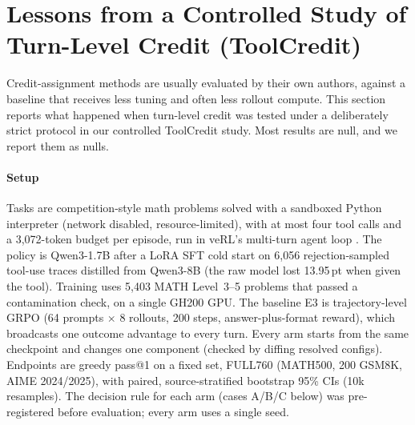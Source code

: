 \section{Lessons from a Controlled Study of Turn-Level Credit (ToolCredit)}\label{sec:toolcredit}

Credit-assignment methods are usually evaluated by their own authors, against a baseline that receives less tuning and often less rollout compute. This section reports what happened when turn-level credit was tested under a deliberately strict protocol in our controlled ToolCredit study. Most results are null, and we report them as nulls.

\paragraph{Setup}
Tasks are competition-style math problems solved with a sandboxed Python interpreter (network disabled, resource-limited), with at most four tool calls and a 3{,}072-token budget per episode, run in veRL's multi-turn agent loop \citep{sheng2025hybridflow}. The policy is Qwen3-1.7B \citep{yang2025qwen3} after a LoRA \citep{hu2022lora} SFT cold start on 6{,}056 rejection-sampled tool-use traces distilled from Qwen3-8B (the raw model lost 13.95\,pt when given the tool). Training uses 5{,}403 MATH Level~3--5 problems that passed a contamination check, on a single GH200 GPU. The baseline E3 is trajectory-level GRPO \citep{shao2024deepseekmath} (64 prompts $\times$ 8 rollouts, 200 steps, answer-plus-format reward), which broadcasts one outcome advantage to every turn. Every arm starts from the same checkpoint and changes one component (checked by diffing resolved configs). Endpoints are greedy pass@1 on a fixed set, FULL760 (MATH500, 200 GSM8K, AIME 2024/2025), with paired, source-stratified bootstrap 95\% CIs (10k resamples). The decision rule for each arm (cases A/B/C below) was pre-registered before evaluation; every arm uses a single seed.

